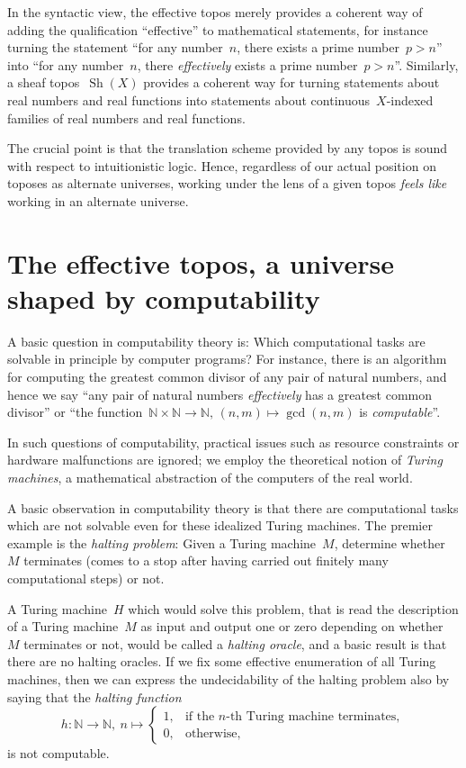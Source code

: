 \documentclass[graybox]{svmult}
\newcommand{\NN}{\mathbb{N}}
\DeclareMathOperator{\Sh}{Sh}
\renewcommand{\_}{\mathpunct{.}\,}
\newcommand{\effective}{ef{}fective\xspace}
\newcommand{\effectively}{ef{}fectively\xspace}
\newcommand{\?}{\,{:}\,}
\begin{document}
In the syntactic view, the \effective topos merely provides a coherent way of
adding the qualification ``\effective'' to mathematical statements, for
instance turning the statement ``for any number~$n$, there exists a prime number~$p
> n$'' into ``for any number~$n$, there \emph{\effectively} exists a prime
number~$p > n$''. Similarly, a sheaf topos~$\Sh(X)$ provides a coherent way for
turning statements about real numbers and real functions into statements about
continuous~$X$-indexed families of real numbers and real functions.

The crucial point is that the translation scheme provided by any topos is sound
with respect to intuitionistic logic. Hence, regardless of our actual position
on toposes as alternate universes, working under the lens of a given topos
\emph{feels like} working in an alternate universe.


\section{The \effective topos, a universe shaped by computability}
\label{sect:effective-topos}

A basic question in computability theory is: Which computational tasks are
solvable in principle by computer programs? For instance, there is an algorithm
for computing the greatest common divisor of any pair of natural numbers, and
hence we say ``any pair of natural numbers \emph{\effectively} has a greatest
common divisor''  or ``the function~$\NN \times \NN \to \NN,\,(n,m) \mapsto
\operatorname{gcd}(n,m)$ is \emph{computable}''.

In such questions of computability, practical issues such as resource
constraints or hardware malfunctions are ignored; we employ the theoretical
notion of \emph{Turing machines}, a mathematical abstraction of the computers
of the real world.

A basic observation in computability theory is that there are computational tasks
which are not solvable even for these idealized Turing machines. The premier
example is the \emph{halting problem}: Given a Turing machine~$M$, determine
whether~$M$ terminates (comes to a stop after having carried out finitely
many computational steps) or not.

A Turing machine~$H$ which would solve this problem, that is read the
description of a Turing machine~$M$ as input and output one or zero depending
on whether~$M$ terminates or not, would be called a \emph{halting oracle}, and
a basic result is that there are no halting oracles. If we fix some \effective
enumeration of all Turing machines, then we can express the undecidability of
the halting problem also by saying that the \emph{halting function}
\[ h : \NN \longrightarrow \NN,\ n \longmapsto \begin{cases}
  1, & \text{if the~$n$-th Turing machine terminates}, \\
  0, & \text{otherwise,}
\end{cases} \]
is not computable.
\end{document}

